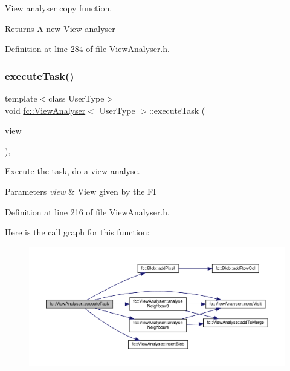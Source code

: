 View analyser copy function. 

\begin{DoxyReturn}{Returns}
A new View analyser 
\end{DoxyReturn}


Definition at line 284 of file View\+Analyser.\+h.

\mbox{\label{classfc_1_1ViewAnalyser_a21fcc5d0b61d0ea9eec739f5173fa0ee}} 
\subsubsection{\texorpdfstring{execute\+Task()}{executeTask()}}
{\footnotesize\ttfamily template$<$class User\+Type$>$ \\
void \hyperlink{classfc_1_1ViewAnalyser}{fc\+::\+View\+Analyser}$<$ User\+Type $>$\+::execute\+Task (\begin{DoxyParamCaption}\item[{std\+::shared\+\_\+ptr$<$ Memory\+Data$<$ \hyperlink{classfi_1_1View}{fi\+::\+View}$<$ User\+Type $>$$>$$>$}]{view }\end{DoxyParamCaption})\hspace{0.3cm}{\ttfamily [inline]}, {\ttfamily [override]}}



Execute the task, do a view analyse. 


\begin{DoxyParams}{Parameters}
{\em view} & View given by the FI \\
\hline
\end{DoxyParams}


Definition at line 216 of file View\+Analyser.\+h.

Here is the call graph for this function\+:
\nopagebreak
\begin{figure}[H]
\begin{center}
\leavevmode
\includegraphics[width=350pt]{df/daf/classfc_1_1ViewAnalyser_a21fcc5d0b61d0ea9eec739f5173fa0ee_cgraph}
\end{center}
\end{figure}
\mbox{\label{classfc_1_1ViewAnalyser_a30ab8c428e5922352be50ff56a14a71e}} 
